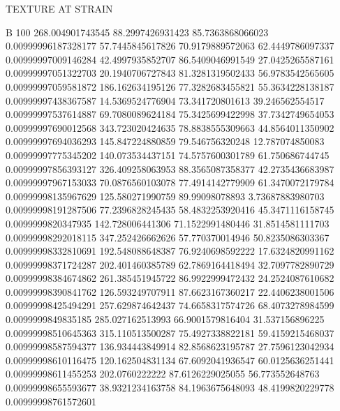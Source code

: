 TEXTURE AT STRAIN


B  100
        268.004901743545        88.2997426931423        85.7363868066023     0.00999996187328177
        57.7445845617826        70.9179889572063        62.4449786097337     0.00999997009146284
        42.4997935852707        86.5409046991549        27.0425265587161     0.00999997051322703
        20.1940706727843        81.3281319502433        56.9783542565605     0.00999997059581872
        186.162634195126        77.3282683455821        55.3634228138187     0.00999997438367587
        14.5369524776904         73.341720801613         39.246562554517     0.00999997537614887
        69.7080089624184        75.3425699422998        37.7342749654053     0.00999997690012568
        343.723020424635        78.8838555309663        44.8564011350902     0.00999997694036293
        145.847224880859         79.546756320248         12.787074850083     0.00999997775345202
        140.073534437151        74.5757600301789         61.750686744745     0.00999997856393127
        326.409258063953        88.3565087358377        42.2735436683987     0.00999997967153033
        70.0876560103078        77.4914142779909        61.3470072179784     0.00999998135967629
        125.580271990759          89.99098078893        3.73687883980703     0.00999998191287506
        77.2396828245435        58.4832253920416        45.3471116158745      0.0099999820347935
        142.728006441306        71.1522991480446        31.8514581111703     0.00999998292018115
        347.252426662626         57.770370014946        50.8235086303367     0.00999998332810691
        192.548088648387        76.9240698592222        17.6324820991162     0.00999998371724287
        202.401460385789        62.7869164418494        32.7097782890729     0.00999998384674862
        261.385451945722        86.9922999472432        24.2524087610682     0.00999998390841762
        126.593249707911        87.6623167360217        22.4406238001506     0.00999998425494291
        257.629874642437        74.6658317574726        68.4073278984599      0.0099999849835185
        285.027162513993        66.9001579816404         31.537156896225     0.00999998510645363
        315.110513500287        75.4927338822181        59.4159215468037     0.00999998587594377
        136.934443849914        82.8568623195787        27.7596123042934     0.00999998610116475
        120.162504831134        67.6092041936547        60.0125636251441     0.00999998611455253
          202.0760222222        87.6126229025055         56.773552648763     0.00999998655593677
        38.9321234163758        84.1963675648093        48.4199820229778     0.00999998761572601

